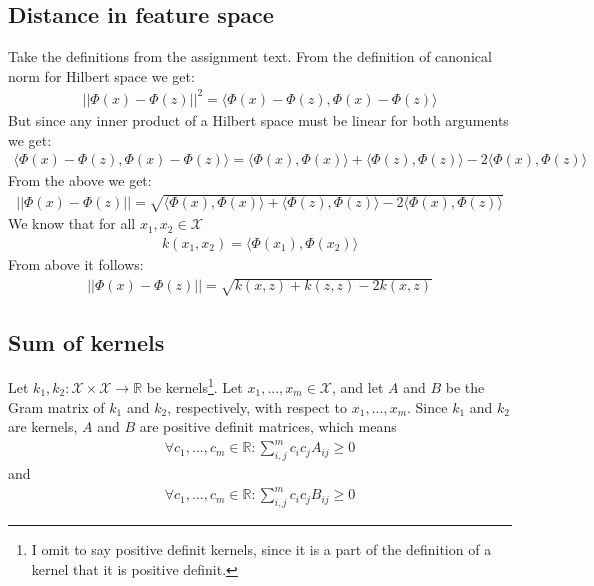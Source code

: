 \subsection{Distance in feature space}
Take the definitions from the assignment text.
From the definition of canonical norm for Hilbert space we get:
\begin{align}
||\Phi(x) - \Phi(z) ||^2 = \langle \Phi(x) - \Phi(z),\Phi(x) - \Phi(z) \rangle
\end{align}
But since any inner product of a Hilbert space must be linear for both arguments we get:
\begin{align}
\langle \Phi(x) - \Phi(z),\Phi(x) - \Phi(z) \rangle = 
\langle \Phi(x),\Phi(x) \rangle + \langle \Phi(z),\Phi(z) \rangle - 2\langle \Phi(x) , \Phi(z) \rangle
\end{align}
From the above we get:
\begin{align}
||\Phi(x) - \Phi(z) || = \sqrt{\langle \Phi(x),\Phi(x) \rangle + \langle \Phi(z),\Phi(z) \rangle - 2\langle \Phi(x) , \Phi(z) \rangle}
\end{align}
We know that for all $x_1, x_2 \in \mathcal{X}$
\begin{align}
k(x_1,x_2)=\langle \Phi(x_1), \Phi(x_2) \rangle
\end{align}
From above it follows:
\begin{align}
||\Phi(x) - \Phi(z) || = \sqrt{k(x,z) + k(z,z) - 2k(x,z)}
\end{align}


\subsection{Sum of kernels}

Let $k_1, k_2: \mathcal{X}\times \mathcal{X} \to \mathbb{R}$ be kernels\footnote{I omit to say positive definit kernels, since it is a part of the definition of a kernel that it is positive definit.}. Let $x_1,...,x_m \in \mathcal{X}$, and let $A$ and $B$ be the Gram matrix of $k_1$ and $k_2$, respectively, with respect to $x_1,...,x_m$. Since $k_1$ and $k_2$ are kernels, $A$ and $B$ are positive definit matrices, which means
\begin{align}
\forall c_1,...,c_m \in \mathbb{R}: \sum_{i,j}^m c_i c_j A_{ij} \geq 0
\end{align}
and 
\begin{align}
\forall c_1,...,c_m \in \mathbb{R}: \sum_{i,j}^m c_i c_j B_{ij} \geq 0
\end{align}

